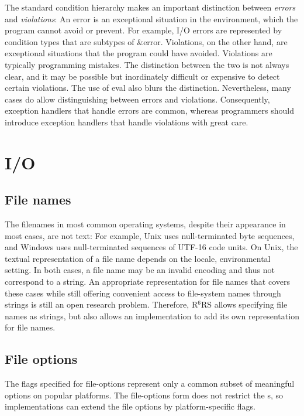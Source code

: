 \documentclass[twoside,twocolumn]{algol60}
\newcommand{\rn}[1]{R$^{#1}$RS}
\begin{document}
The standard condition hierarchy makes an important distinction
between \emph{errors} and \emph{violations}: An error is an
exceptional situation in the environment, which the program cannot
avoid or prevent.  For example, I/O errors are represented by
condition types that are subtypes of {\cf\&error}.  Violations, on the
other hand, are exceptional situations that the program could have
avoided.  Violations are typically programming mistakes.  The
distinction between the two is not always clear, and it may be possible
but inordinately difficult or expensive to detect certain violations.
The use of {\cf eval} also blurs the distinction.  Nevertheless, many
cases do allow distinguishing between errors and violations.
Consequently, exception handlers that handle errors are common,
whereas programmers should introduce exception handlers that handle
violations with great care.


\chapter{I/O}

\section{File names}
\label{filenamesection}

The filenames in most common operating systems, despite their
appearance in most cases, are not text: For example, Unix uses
null-terminated byte sequences, and Windows uses null-terminated
sequences of UTF-16 code units.  On Unix, the textual representation
of a file name depends on the locale, environmental setting.  In both
cases, a file name may be an invalid encoding and thus not correspond
to a string.  An appropriate representation for file names that covers
these cases while still offering convenient access to file-system
names through strings is still an open research problem.  Therefore,
\rn{6} allows specifying file names as strings, but also allows an
implementation to add its own representation for file names.

\section{File options}

The flags specified for {\cf file-options} represent only a common
subset of meaningful options on popular platforms.  The {\cf
  file-options} form does not restrict the s,
so implementations can extend the file options by platform-specific
flags.
\end{document}
